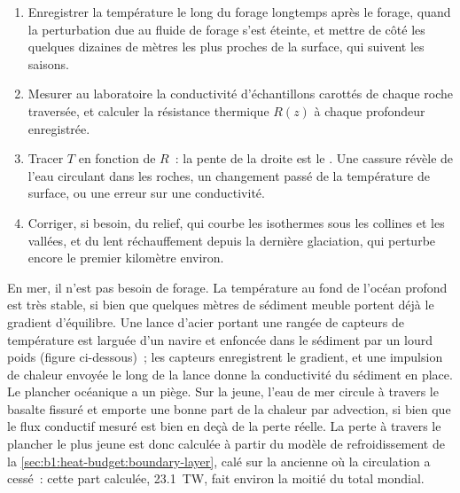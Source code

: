 \begin{method}\label{met:b1:heat-budget:borehole}
\begin{enumerate}
  \item Enregistrer la température le long du forage longtemps après le forage,
        quand la perturbation due au fluide de forage s'est éteinte, et mettre de
        côté les quelques dizaines de mètres les plus proches de la surface, qui
        suivent les saisons.
  \item Mesurer au laboratoire la conductivité d'échantillons carottés de chaque
        roche traversée, et calculer la résistance thermique $R(z)$ à chaque
        profondeur enregistrée.
  \item Tracer $T$ en fonction de $R$~: la pente de la droite est le . Une cassure révèle de l'eau circulant dans les roches, un
        changement passé de la température de surface, ou une erreur sur une
        conductivité.
  \item Corriger, si besoin, du relief, qui courbe les isothermes sous les
        collines et les vallées, et du lent réchauffement depuis la dernière
        glaciation, qui perturbe encore le premier kilomètre environ.
\end{enumerate}
\end{method}

En mer, il n'est pas besoin de forage. La température au fond de l'océan profond
est très stable, si bien que quelques mètres de sédiment meuble portent déjà le
gradient d'équilibre. Une lance d'acier portant une rangée de capteurs de
température est larguée d'un navire et enfoncée dans le sédiment par un lourd
poids (figure ci-dessous)~; les capteurs enregistrent le gradient, et une
impulsion de chaleur envoyée le long de la lance donne la conductivité du
sédiment en place.
Le plancher océanique a un piège. Sur la  jeune, l'eau de mer circule à
travers le basalte fissuré et emporte une bonne part de la chaleur par advection,
si bien que le flux conductif mesuré est bien en deçà de la perte réelle. La perte
à travers le plancher le plus jeune est donc calculée à partir du modèle de
refroidissement de la \cref{sec:b1:heat-budget:boundary-layer}, calé sur la
 ancienne où la circulation a cessé~: cette part calculée, \qty{23.1}{TW},
fait environ la moitié du total mondial. %

